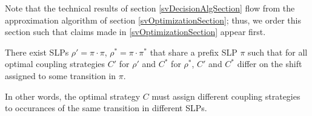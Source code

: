 Note that the technical results of section \ref{svDecisionAlgSection} flow from the approximation algorithm of section \ref{svOptimizationSection}; thus, we order this section such that claims made in \ref{svOptimizationSection} appear first. 


\begin{prop}\label{costDependspathProp}
    There exist SLPs $\rho'=\pi\cdot \pi$, $\rho^*=\pi\cdot\pi^*$ that share a prefix SLP $\pi$ such that for all optimal coupling strategies $C'$ for $\rho'$ and $C^*$ for $\rho^*$, $C'$ and $C^*$ differ on the shift assigned to some transition in $\pi$. 

    In other words, the optimal strategy $C$ must assign different coupling strategies to occurances of the same transition in different SLPs. 
\end{prop}

